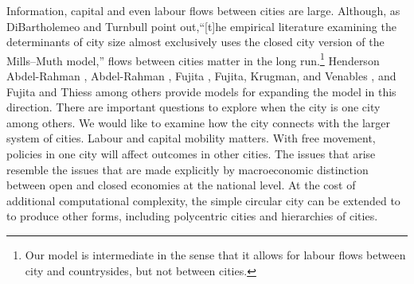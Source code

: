 Information, capital and even labour flows between cities are large.  Although, as DiBartholemeo and Turnbull \cite{dibartolomeoClosedVsOpen2023} point out,``[t]he empirical literature examining the determinants of city size almost exclusively uses the closed city version of the Mills–Muth model,'' flows between cities matter in the long run.\footnote{Our model is intermediate in the sense that it allows for labour flows  between city and countrysides, but not between cities.} Henderson Abdel-Rahman \cite{Henderson1972Sizes}, Abdel-Rahman \cite{abdel-rahmanAgglomerationEconomiesTypes1990}, Fujita \cite{fujitaMonopolisticCompetitionModel1988}, Fujita, Krugman, and Venables \cite{fujitaSpatialEconomyCities1999}, and Fujita and Thiess \cite{fujitaEconomicsAgglomeration1996} among others provide models for expanding the model in this direction. There are important questions to explore when the city is one city among others. We would like to examine how the city connects with the larger system of cities.  Labour and capital mobility matters. With free movement, policies in one city will affect outcomes in other cities. The issues that arise resemble the issues that are made explicitly by  macroeconomic distinction between open and closed economies at the national level\cite{hendersonSystemsCitiesClosed1982, dibartolomeoUrbanSprawlClosed2021}. %
At the cost of additional computational complexity, the simple circular city can be extended to to produce other forms, including polycentric cities and hierarchies of cities.






